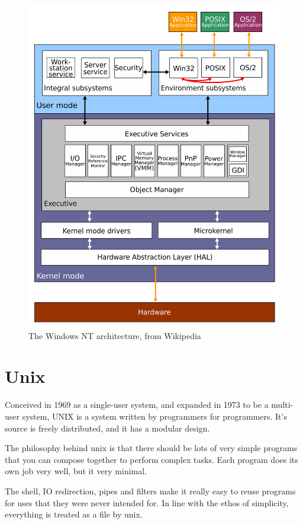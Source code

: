 \begin{figure}[ht!]
  \includegraphics[width=\textwidth]{images/windows-arch}
  \caption{The Windows NT architecture, from Wikipedia}
  \label{win-arch}
\end{figure}

\section{Unix}

Conceived in 1969 as a single-user system, and expanded in 1973 to be a multi-
user system, UNIX is a system written by programmers for programmers. It's
source is freely distributed, and it has a modular design.

The philosophy behind unix is that there should be lots of very simple programs
that you can compose together to perform complex tasks. Each program does its
own job very well, but it very minimal.

The shell, IO redirection, pipes and filters make it really easy to reuse
programs for uses that they were never intended for. In line with the ethos of
simplicity, everything is treated as a file by unix.

